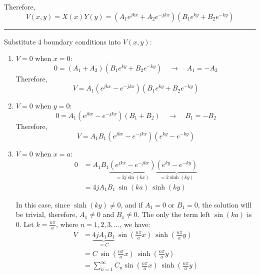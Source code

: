 \documentclass[a4paper, 12pt]{article}
\begin{document}
\begin{mdframed}
Therefore,
\[
    V(x, y)
    = X(x) Y(y) 
    = (A_{1}e^{jkx}+ A_{2}e^{-jkx}) (B_{1}e^{ky}+B_{2}e^{-ky}) 
\]
\hrule \vspace{.3cm}

Substitute 4 boundary conditions into $V(x, y)$:

\begin{enumerate}
    \item $V=0$ when $x=0$:
    \[ 
        0 = (A_{1}+A_{2})(B_{1}e^{ky}+B_{2}e^{-ky}) \quad \to \quad A_{1}=-A_{2}
    \]
    Therefore,
    \[
        V = A_{1}(e^{jkx}-e^{-jkx})(B_{1}e^{ky}+B_{2}e^{-ky})
    \]
    
    \item $V=0$ when $y=0$:
    \[
        0 = A_{1}(e^{jkx}-e^{-jkx})(B_{1}+B_{2}) \quad \to \quad 
        B_{1} = -B_{2} 
    \]
    Therefore,
    \[ 
        V = A_{1}B_{1}(e^{jkx}-e^{-jkx})(e^{ky}-e^{-ky})
    \]
    
   \item $V=0$ when $x=a$:
   \begin{align*} 
        0 
        &= A_{1}B_{1} \underbrace{(e^{jkx}-e^{-jkx})}_{=2j \sin (kx)} \underbrace{(e^{ky}-e^{-ky})}_{=2\sinh(ky)}\\[.5em]
        &= 4j A_{1}B_{1} \ \sin(ka) \ \sinh(ky)
    \end{align*}
    
    In this case, since $\sinh(ky)\neq 0$, and if $A_1 = 0$ or $B_1 = 0$, the solution will be trivial, therefore, $A_1\neq 0$ and $B_1\neq 0$. The only the term left $\sin(ka)$ is 0. Let $k=\frac{n\pi}{a}$, where $n=1, 2, 3, ...$, we have:
    \begin{align*} 
    V 
        &= \underbrace{4 j A_{1} B_{1}}_{=C} \ \sin \left(\frac{n\pi}{a} x \right) \ \sinh \left(\frac{n\pi}{a} y \right) \\
        &= C \ \sin \left(\frac{n\pi}{a} x \right) \ \sinh \left( \frac{n\pi}{a} y \right)\\
     &= \sum^{\infty}_{n=1} C_{n} \sin \left( \frac{n\pi}{a} x \right) \ \sinh \left( \frac{n\pi}{a} y \right)
    \end{align*}
    

\end{enumerate}
\end{mdframed}
\end{document}
